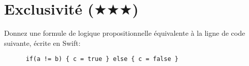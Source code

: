 \documentclass[a4paper, titlepage]{article}
\numberwithin{figure}{section}
\numberwithin{table}{section}
\begin{document}
  \section{Exclusivité ($\bigstar\bigstar\bigstar$)}
    Donnez une formule de logique propositionnelle équivalente à la ligne de code suivante,
    écrite en Swift:
    \begin{verbatim}
      if(a != b) { c = true } else { c = false }
    \end{verbatim}
\end{document}
